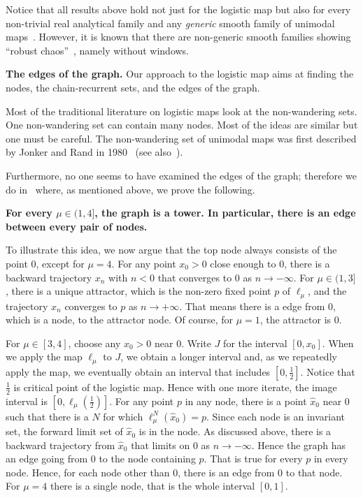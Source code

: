 \documentclass{article}
\def\gr{}
\newcommand{\BF}{\boldmath}
\begin{document}
Notice that all results above hold not just for the logistic map but also for every non-trivial real analytical family and any {\em generic} smooth family of unimodal maps~\cite{dM04,SvS14}.
However, it is known that there are non-generic smooth families showing ``robust chaos''~\cite{BGY98,AA01,vS10}, namely without windows.

{\bf The edges of the \gr graph.} 
Our approach to the logistic map aims at finding the nodes, the chain-recurrent sets, and the edges of the graph.

Most of the traditional literature on logistic maps look at the  non-wandering sets.
One non-wandering set can contain many nodes.
Most of the ideas are similar but one must be careful.
The non-wandering set of unimodal maps was first described by Jonker and Rand in 1980~\cite{JR80} (see also~\cite{vS81,HW84,BL91,dMvS93,Blo95,SKSF97}). 

Furthermore, no one seems to have examined the edges of the graph; therefore we do in~\cite{DLY20} where, as mentioned above, 
we prove the following.

{\bf 
For every {\BF$\mu\in (1,4]$}, the graph is a tower.
In particular, there is an edge between every pair of nodes.}



To illustrate this idea, we now argue that the top node always consists of the point 0, except for $\mu=4$. For any point $x_0>0$ close enough to 0, there is a backward trajectory $x_n$ with $n<0$ that converges to $0$ as $n\to-\infty$. For $\mu\in(1,3]$, there is a unique attractor, which is the non-zero fixed point $p$ of $\ell_\mu$, and 
the trajectory $x_n$ converges to $p$ as $n\to+\infty.$
That means there is a edge from 0, which is a node, to the attractor node. Of course, for $\mu = 1$, the attractor is 0.

For $\mu\in[3,4]$, choose any $x_0>0$ near 0. Write $J$ for the interval $[0,x_0]$.
When we apply the map $\ell_\mu$ to $J$, we obtain a longer interval and, as we repeatedly apply the map, we eventually obtain an interval that includes $[0,\frac{1}{2}]$.
Notice that $\frac{1}{2}$ is critical point of the logistic map.
Hence with one more iterate, the image interval is 
$[0, \ell_\mu(\frac{1}{2})].$
For any point $p$ in any node, there is a point $\hat x_0$ near 0 such that there is a $N$ for which $\ell_\mu^N(\hat x_0) = p$. 
Since each node is an invariant set, the forward limit set of $\hat x_0$ is in the node.  
As discussed above, there is a backward trajectory from $\hat x_0$ that limits on $0$ as $n\to-\infty$. 
Hence the graph has an edge going from $0$ to the node containing $p$. 
That is true for every $p$ in every node.
Hence, for each node other than $0$,
there is an edge from $0$ to that node.
For $\mu=4$ there is a single node, that is the whole interval $[0,1]$.
\end{document}
